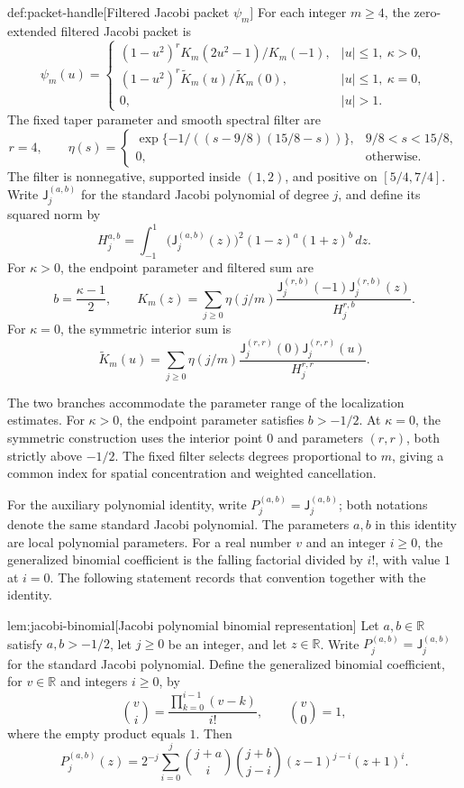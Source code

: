 \begin{definitionv}{def:packet-handle}[Filtered Jacobi packet \(\psi_m\)]
For each integer \(m\ge4\), the zero-extended filtered Jacobi packet is
\[
\psi_m(u)=
\begin{cases}
(1-u^2)^r K_m(2u^2-1)/K_m(-1),
& |u|\le1,\ \kappa>0,\\
(1-u^2)^r\widetilde K_m(u)/\widetilde K_m(0),
& |u|\le1,\ \kappa=0,\\
0,& |u|>1.
\end{cases}
\]
The fixed taper parameter and smooth spectral filter are
\[
r=4,\qquad
\eta(s)=
\begin{cases}
\exp\{-1/((s-9/8)(15/8-s))\},
& 9/8<s<15/8,\\
0,& \text{otherwise}.
\end{cases}
\]
The filter is nonnegative, supported inside \((1,2)\), and positive on \([5/4,7/4]\). Write \(\mathsf J_j^{(a,b)}\) for the standard Jacobi polynomial of degree \(j\), and define its squared norm by
\[
H_j^{a,b}
=
\int_{-1}^{1}
\bigl(\mathsf J_j^{(a,b)}(z)\bigr)^2
(1-z)^a(1+z)^b\,dz.
\]
For \(\kappa>0\), the endpoint parameter and filtered sum are
\[
b=\frac{\kappa-1}{2},\qquad
K_m(z)=\sum_{j\ge0}\eta(j/m)
\frac{\mathsf J_j^{(r,b)}(-1)\mathsf J_j^{(r,b)}(z)}
{H_j^{r,b}}.
\]
For \(\kappa=0\), the symmetric interior sum is
\[
\widetilde K_m(u)=\sum_{j\ge0}\eta(j/m)
\frac{\mathsf J_j^{(r,r)}(0)\mathsf J_j^{(r,r)}(u)}
{H_j^{r,r}}.
\]
\end{definitionv}

The two branches accommodate the parameter range of the localization estimates. For \(\kappa>0\), the endpoint parameter satisfies \(b>-1/2\). At \(\kappa=0\), the symmetric construction uses the interior point \(0\) and parameters \((r,r)\), both strictly above \(-1/2\). The fixed filter selects degrees proportional to \(m\), giving a common index for spatial concentration and weighted cancellation.

For the auxiliary polynomial identity, write \(P_j^{(a,b)}=\mathsf J_j^{(a,b)}\); both notations denote the same standard Jacobi polynomial. The parameters \(a,b\) in this identity are local polynomial parameters. For a real number \(v\) and an integer \(i\ge0\), the generalized binomial coefficient is the falling factorial divided by \(i!\), with value \(1\) at \(i=0\). The following statement records that convention together with the identity.

\begin{lemmav}{lem:jacobi-binomial}[Jacobi polynomial binomial representation]
Let \(a,b\in\mathbb R\) satisfy \(a,b>-1/2\), let \(j\ge0\) be an integer, and let \(z\in\mathbb R\). Write \(P_j^{(a,b)}=\mathsf J_j^{(a,b)}\) for the standard Jacobi polynomial. Define the generalized binomial coefficient, for \(v\in\mathbb R\) and integers \(i\ge0\), by
\[
\binom{v}{i}=\frac{\prod_{k=0}^{i-1}(v-k)}{i!},
\qquad \binom{v}{0}=1,
\]
where the empty product equals \(1\). Then
\[
P_j^{(a,b)}(z)
=2^{-j}\sum_{i=0}^{j}
\binom{j+a}{i}\binom{j+b}{j-i}
(z-1)^{j-i}(z+1)^i.
\]
\end{lemmav}


